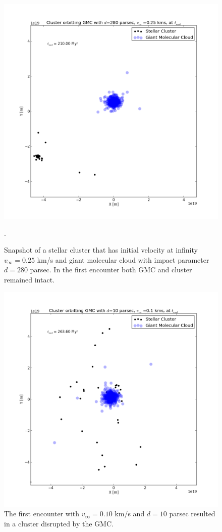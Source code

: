\documentclass{aa}
\begin{document}
\begin{figure}[h!]
    \centering
    \includegraphics[width=\hsize]{img/v_25_d_280_second_encounter.png}
    \caption{Snapshot of a stellar cluster that has initial velocity at infinity $v_\infty = 0.25$ km/s and giant molecular cloud with impact parameter $d = 280$ parsec. In the first encounter both GMC and cluster remained intact.}\label{fig:v_25_d_280_sec}.
\end{figure}
\begin{figure}[h!]
    \centering
    \includegraphics[width=\hsize]{img/v_10_d_10_second_encounter.png}
    \caption{The first encounter with $v_\infty = 0.10$ km/s and $d = 10$ parsec resulted in a cluster disrupted by the GMC.}\label{fig:v_10_d_10_sec}
\end{figure}
\end{document}
